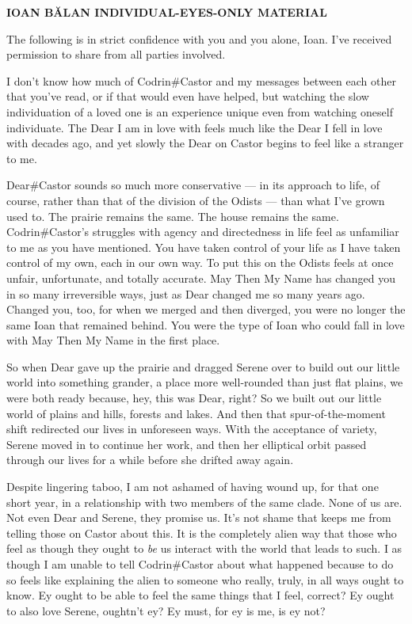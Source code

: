\begin{center}
\textbf{IOAN BĂLAN INDIVIDUAL-EYES-ONLY MATERIAL}
\end{center}

The following is in strict confidence with you and you alone, Ioan. I've received permission to share from all parties involved.

I don't know how much of Codrin\#Castor and my messages between each other that you've read, or if that would even have helped, but watching the slow individuation of a loved one is an experience unique even from watching oneself individuate. The Dear I am in love with feels much like the Dear I fell in love with decades ago, and yet slowly the Dear on Castor begins to feel like a stranger to me.

Dear\#Castor sounds so much more conservative — in its approach to life, of course, rather than that of the division of the Odists — than what I've grown used to. The prairie remains the same. The house remains the same. Codrin\#Castor's struggles with agency and directedness in life feel as unfamiliar to me as you have mentioned. You have taken control of your life as I have taken control of my own, each in our own way. To put this on the Odists feels at once unfair, unfortunate, and totally accurate. May Then My Name has changed you in so many irreversible ways, just as Dear changed me so many years ago. Changed you, too, for when we merged and then diverged, you were no longer the same Ioan that remained behind. You were the type of Ioan who could fall in love with May Then My Name in the first place.

So when Dear gave up the prairie and dragged Serene over to build out our little world into something grander, a place more well-rounded than just flat plains, we were both ready because, hey, this was Dear, right? So we built out our little world of plains and hills, forests and lakes. And then that spur-of-the-moment shift redirected our lives in unforeseen ways. With the acceptance of variety, Serene moved in to continue her work, and then her elliptical orbit passed through our lives for a while before she drifted away again.

Despite lingering taboo, I am not ashamed of having wound up, for that one short year, in a relationship with two members of the same clade. None of us are. Not even Dear and Serene, they promise us. It's not shame that keeps me from telling those on Castor about this. It is the completely alien way that those who feel as though they ought to \emph{be} us interact with the world that leads to such. I as though I am unable to tell Codrin\#Castor about what happened because to do so feels like explaining the alien to someone who really, truly, in all ways ought to know. Ey ought to be able to feel the same things that I feel, correct? Ey ought to also love Serene, oughtn't ey? Ey must, for ey is me, is ey not?

